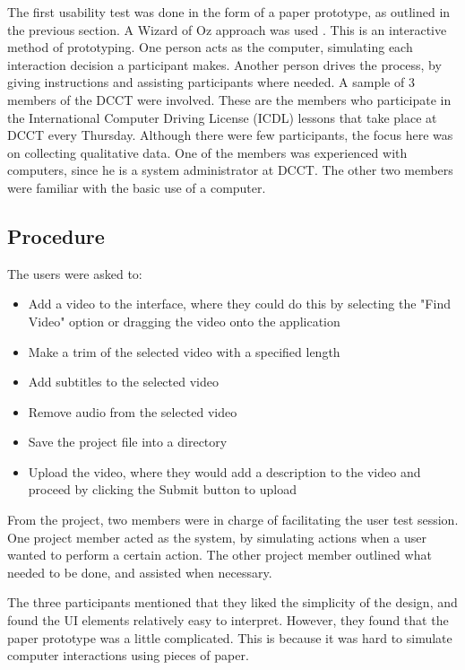 \documentclass{sig-alternate-05-2015}
\begin{document}
The first usability test was done in the form of a paper prototype, as outlined in the previous section. A Wizard of Oz approach was used \cite{arnowitz2010effective}. This is an interactive method of prototyping. One person acts as the computer, simulating each interaction decision a participant makes. Another person drives the process, by giving instructions and assisting participants where needed. A sample of 3 members of the DCCT were involved. These are the members who participate in the International Computer Driving License (ICDL) lessons that take place at DCCT every Thursday. Although there were few participants, the focus here was on collecting qualitative data. One of the members was experienced with computers, since he is a system administrator at DCCT. The other two members were familiar with the basic use of a computer.

\subsection*{Procedure}
The users were asked to:
\begin{itemize}
  \item Add a video to the interface, where they could do this by selecting the "Find Video" option or dragging the video onto the application
  \item Make a trim of the selected video with a specified length
  \item Add subtitles to the selected video
  \item Remove audio from the selected video
  \item Save the project file into a directory
  \item Upload the video, where they would add a description to the video and proceed by clicking the Submit button to upload
\end{itemize}

From the project, two members were in charge of facilitating the user test session. One project member acted as the system, by simulating actions when a user wanted to perform a certain action. The other project member outlined what needed to be done, and assisted when necessary.

The three participants mentioned that they liked the simplicity of the design, and found the UI elements relatively easy to interpret. However, they found that the paper prototype was a little complicated. This is because it was hard to simulate computer interactions using pieces of paper.
\end{document}
